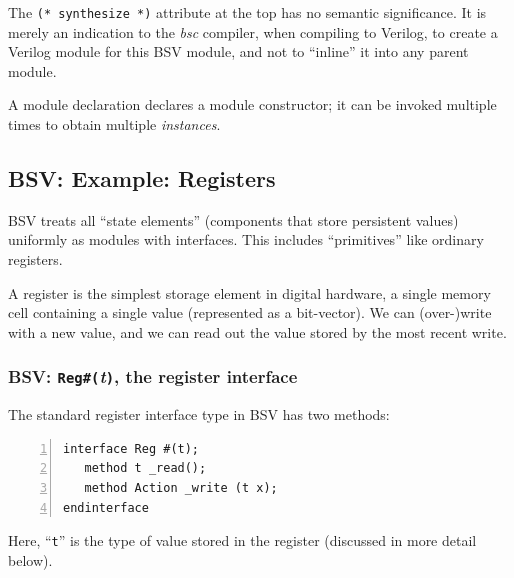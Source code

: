 
The \verb|(* synthesize *)| attribute at the top has no semantic
significance.  It is merely an indication to the \emph{bsc} compiler,
when compiling to Verilog, to create a Verilog module for this BSV
module, and not to ``inline'' it into any parent module.


A module declaration declares a module constructor; it can be invoked
multiple times to obtain multiple \emph{instances}.


\subsection{BSV: Example: Registers}


BSV treats all ``state elements'' (components that store persistent
values) uniformly as modules with interfaces.  This includes
``primitives'' like ordinary registers.

A register is the simplest storage element in digital hardware, a
single memory cell containing a single value (represented as a
bit-vector).  We can (over-)write with a new value, and we can read
out the value stored by the most recent write.


\subsubsection{BSV: {\tt Reg\#(}\emph{t}{\tt )}, the register interface}

\label{Sec_Magritte_Fetch_Decode_Register_interface}


The standard register interface type in BSV has two methods:

\begin{Verbatim}[frame=single, numbers=left]
interface Reg #(t);
   method t _read();
   method Action _write (t x);
endinterface
\end{Verbatim}

Here, ``\verb|t|'' is the type of value stored in the register
(discussed in more detail below).

